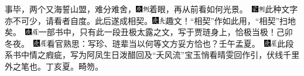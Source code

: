 {事毕，两个又海誓山盟，难分难舍，{{\includegraphics[width=3mm]{../Images/00004}\includegraphics[width=3mm]{../Images/00011}\footnotesize \kaishu 着眼，再从前看如何光景。}　\includegraphics[width=3mm]{../Images/00006}\includegraphics[width=3mm]{../Images/00011}\footnotesize \kaishu 此种文字亦不可少，请看者自度。}此后遂成相契。{\includegraphics[width=3mm]{../Images/00004}\includegraphics[width=3mm]{../Images/00012}\footnotesize \kaishu 趣文！“相契”作如此用，“相契”扫地矣。　{\includegraphics[width=3mm]{../Images/00004}\includegraphics[width=3mm]{../Images/00010}\footnotesize \kaishu 一部书中，只有此一段丑极太露之文，写于贾琏身上，恰极当极！己卯冬夜。　\includegraphics[width=3mm]{../Images/00004}\includegraphics[width=3mm]{../Images/00010}\footnotesize \kaishu 看官熟思：写珍、琏辈当以何等文方妥方恰也？壬午孟夏。　\includegraphics[width=3mm]{../Images/00004}\includegraphics[width=3mm]{../Images/00010}\footnotesize \kaishu 此段系书中情之瘕疵，写为阿凤生日泼醋回及“夭风流”宝玉悄看晴雯回作引，伏线千里外之笔也。丁亥夏。畸笏。}}

}
